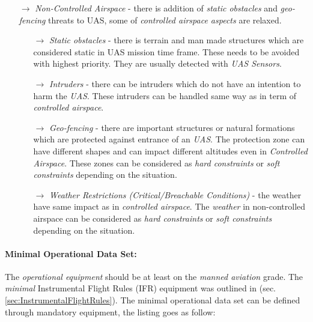 \begin{itemize}
    \item[$\to$] \emph{Non-Controlled Airspace} - there is addition of \emph{static obstacles} and \emph{geo-fencing} threats to UAS, some of \emph{controlled airspace aspects} are relaxed.
    
    \begin{itemize}
        \item[$\to$] \emph{Static obstacles} - there is terrain and man made structures which are considered static in UAS mission time frame. These needs to be avoided with highest priority. They are usually detected with \emph{UAS Sensors}.
        
        \item[$\to$] \emph{Intruders} - there can be intruders which do not have an intention to harm the \emph{UAS}. These intruders can be handled same way as in term of \emph{controlled airspace}.
        
        \item[$\to$] \emph{Geo-fencing} - there are important structures or natural formations which are protected against entrance of an \emph{UAS}. The protection zone can have different shapes and can impact different altitudes even in \emph{Controlled Airspace}. These zones can be considered as \emph{hard constraints} or \emph{soft constraints} depending on the situation.
        
        \item[$\to$] \emph{Weather Restrictions (Critical/Breachable Conditions)} - the weather have same impact as in \emph{controlled airspace}. The \emph{weather} in non-controlled airspace can be considered as \emph{hard constraints} or \emph{soft constraints} depending on the situation.
    \end{itemize}
\end{itemize}

\paragraph{Minimal Operational Data Set:} The \emph{operational equipment} should be at least on the \emph{manned aviation} grade. The \emph{minimal} Instrumental Flight Rules (IFR) equipment was outlined in (sec. \ref{sec:InstrumentalFlightRules}). The minimal operational data set can be defined through mandatory equipment, the listing goes as follow:

